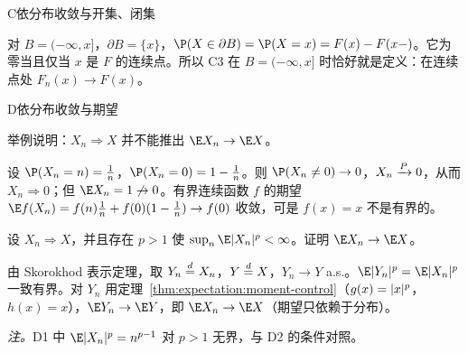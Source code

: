 \begin{probleme}{C}{依分布收敛与开集、闭集}
\begin{questions}
\begin{solution}
对 $B=(-\infty,x]$，$\partial B=\{x\}$，$\P(X\in\partial B)=\P(X=x)=F(x)-F(x-)$。它为零当且仅当 $x$ 是 $F$ 的连续点。所以 C3 在 $B=(-\infty,x]$ 时恰好就是定义：在连续点处 $F_n(x)\to F(x)$。
\end{solution}
\end{questions}
\end{probleme}

\thinkingpart

\begin{probleme}[问题]{D}{依分布收敛与期望}
\begin{questions}
\item 举例说明：$X_n\Rightarrow X$ 并不能推出 $\E X_n\to \E X$。
\begin{solution}
设 $\P(X_n=n)=\frac1n$，$\P(X_n=0)=1-\frac1n$。则 $\P(X_n\neq0)\to0$，$X_n\xrightarrow{P}0$，从而 $X_n\Rightarrow0$；但 $\E X_n=1\not\to0$。有界连续函数 $f$ 的期望 $\E f(X_n)=f(n)\frac1n+f(0)(1-\frac1n)\to f(0)$ 收敛，可是 $f(x)=x$ 不是有界的。
\end{solution}
\item 设 $X_n\Rightarrow X$，并且存在 $p>1$ 使 $\sup_n\E\abs{X_n}^p<\infty$。证明 $\E X_n\to \E X$。
\begin{solution}
由 Skorokhod 表示定理，取 $Y_n\stackrel{d}{=} X_n$，$Y\stackrel{d}{=} X$，$Y_n\to Y$ a.s.。$\E\abs{Y_n}^p=\E\abs{X_n}^p$ 一致有界。对 $Y_n$ 用定理~\ref{thm:expectation:moment-control}（$g(x)=\lvert x\rvert^p$，$h(x)=x$），$\E Y_n\to \E Y$，即 $\E X_n\to \E X$（期望只依赖于分布）。

\emph{注。}D1 中 $\E\abs{X_n}^p=n^{p-1}$ 对 $p>1$ 无界，与 D2 的条件对照。
\end{solution}
\end{questions}
\end{probleme}


